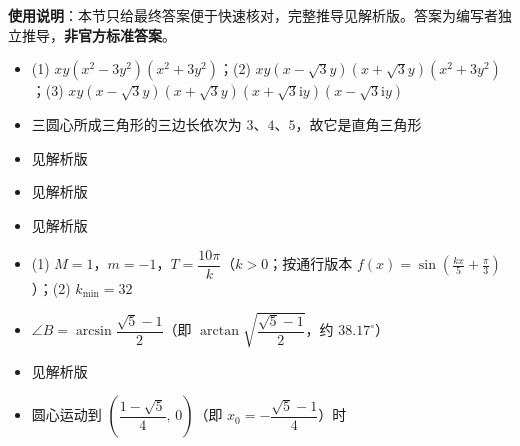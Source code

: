 
\begin{gknotice}
\textbf{使用说明}：本节只给最终答案便于快速核对，完整推导见解析版。答案为编写者独立推导，\textbf{非官方标准答案}。
\end{gknotice}

\begin{itemize}[leftmargin=2.6em]
  \item[\textbf{1.}] (1) $xy(x^2-3y^2)(x^2+3y^2)$；(2) $xy(x-\sqrt3y)(x+\sqrt3y)(x^2+3y^2)$；(3) $xy(x-\sqrt3y)(x+\sqrt3y)(x+\sqrt3\mathrm iy)(x-\sqrt3\mathrm iy)$
  \item[\textbf{2.}] 三圆心所成三角形的三边长依次为 $3$、$4$、$5$，故它是直角三角形
  \item[\textbf{3.}] 见解析版
  \item[\textbf{4.}] 见解析版
  \item[\textbf{5.}] 见解析版
  \item[\textbf{6.}] (1) $M=1$，$m=-1$，$T=\dfrac{10\pi}{k}$（$k>0$；按通行版本 $f(x)=\sin\left(\frac{kx}{5}+\frac{\pi}{3}\right)$）；(2) $k_{\min}=32$
  \item[\textbf{7.}] $\angle B=\arcsin\dfrac{\sqrt5-1}{2}$（即 $\arctan\sqrt{\dfrac{\sqrt5-1}{2}}$，约 $38.17^\circ$）
  \item[\textbf{8.}] 见解析版
  \item[\textbf{9.}] 圆心运动到 $\left(\dfrac{1-\sqrt5}{4},\,0\right)$（即 $x_0=-\dfrac{\sqrt5-1}{4}$）时
\end{itemize}
